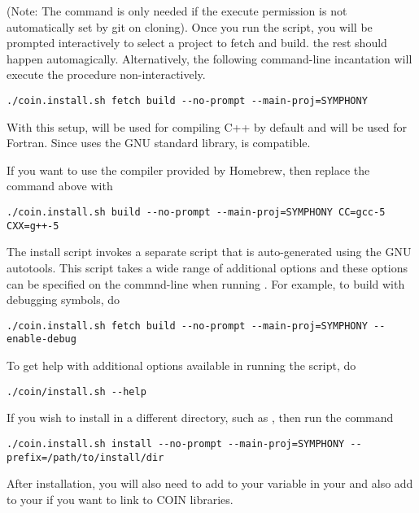 (Note: The  command is only needed if the execute permission is not
automatically set by git on cloning). Once you run the script,
you will be prompted interactively to select a project to fetch and build. the
rest should happen automagically. Alternatively, the following command-line
incantation will execute the procedure non-interactively.

{\color{Brown}
\begin{verbatim}
./coin.install.sh fetch build --no-prompt --main-proj=SYMPHONY
\end{verbatim}
}

With this setup,  will be used for compiling C++ by default and
 will be used for Fortran. Since  uses the GNU standard
library,  is compatible.

If you want to use the  compiler provided by Homebrew, then replace the
 command above with

{\color{Brown}
\begin{verbatim}
./coin.install.sh build --no-prompt --main-proj=SYMPHONY CC=gcc-5 CXX=g++-5
\end{verbatim}
}

The install script invokes a separate  script that is
auto-generated using the GNU autotools. This script takes a wide range of
additional options and these options can be specified on the commnd-line when
running . For example, to build with debugging symbols,
do

{\color{Brown}
\begin{verbatim}
./coin.install.sh fetch build --no-prompt --main-proj=SYMPHONY --enable-debug
\end{verbatim}
}

To get help with additional options available in running the script, do

{\color{Brown}
\begin{verbatim}
./coin/install.sh --help
\end{verbatim}
}

If you wish to install in a different directory, such as , then run
the command

{\color{Brown}
\begin{verbatim}
./coin.install.sh install --no-prompt --main-proj=SYMPHONY --prefix=/path/to/install/dir
\end{verbatim}
}

After installation, you will also need to add  to your
 variable in your  and also add 
to your  if you want to link to COIN libraries. 

